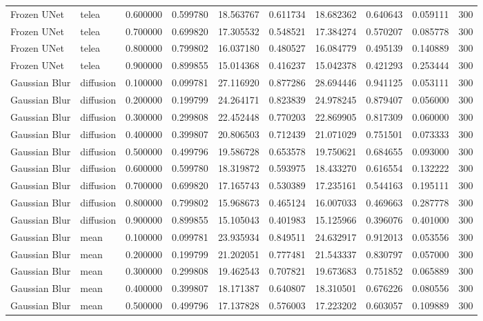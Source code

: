 \begin{table}[h]
\begin{tabular}{llrrrrrrrr}
Frozen UNet & telea & 0.600000 & 0.599780 & 18.563767 & 0.611734 & 18.682362 & 0.640643 & 0.059111 & 300 \\
Frozen UNet & telea & 0.700000 & 0.699820 & 17.305532 & 0.548521 & 17.384274 & 0.570207 & 0.085778 & 300 \\
Frozen UNet & telea & 0.800000 & 0.799802 & 16.037180 & 0.480527 & 16.084779 & 0.495139 & 0.140889 & 300 \\
Frozen UNet & telea & 0.900000 & 0.899855 & 15.014368 & 0.416237 & 15.042378 & 0.421293 & 0.253444 & 300 \\
Gaussian Blur & diffusion & 0.100000 & 0.099781 & 27.116920 & 0.877286 & 28.694446 & 0.941125 & 0.053111 & 300 \\
Gaussian Blur & diffusion & 0.200000 & 0.199799 & 24.264171 & 0.823839 & 24.978245 & 0.879407 & 0.056000 & 300 \\
Gaussian Blur & diffusion & 0.300000 & 0.299808 & 22.452448 & 0.770203 & 22.869905 & 0.817309 & 0.060000 & 300 \\
Gaussian Blur & diffusion & 0.400000 & 0.399807 & 20.806503 & 0.712439 & 21.071029 & 0.751501 & 0.073333 & 300 \\
Gaussian Blur & diffusion & 0.500000 & 0.499796 & 19.586728 & 0.653578 & 19.750621 & 0.684655 & 0.093000 & 300 \\
Gaussian Blur & diffusion & 0.600000 & 0.599780 & 18.319872 & 0.593975 & 18.433270 & 0.616554 & 0.132222 & 300 \\
Gaussian Blur & diffusion & 0.700000 & 0.699820 & 17.165743 & 0.530389 & 17.235161 & 0.544163 & 0.195111 & 300 \\
Gaussian Blur & diffusion & 0.800000 & 0.799802 & 15.968673 & 0.465124 & 16.007033 & 0.469663 & 0.287778 & 300 \\
Gaussian Blur & diffusion & 0.900000 & 0.899855 & 15.105043 & 0.401983 & 15.125966 & 0.396076 & 0.401000 & 300 \\
Gaussian Blur & mean & 0.100000 & 0.099781 & 23.935934 & 0.849511 & 24.632917 & 0.912013 & 0.053556 & 300 \\
Gaussian Blur & mean & 0.200000 & 0.199799 & 21.202051 & 0.777481 & 21.543337 & 0.830797 & 0.057000 & 300 \\
Gaussian Blur & mean & 0.300000 & 0.299808 & 19.462543 & 0.707821 & 19.673683 & 0.751852 & 0.065889 & 300 \\
Gaussian Blur & mean & 0.400000 & 0.399807 & 18.171387 & 0.640807 & 18.310501 & 0.676226 & 0.080556 & 300 \\
Gaussian Blur & mean & 0.500000 & 0.499796 & 17.137828 & 0.576003 & 17.223202 & 0.603057 & 0.109889 & 300 \\

\end{tabular}
\end{table}

